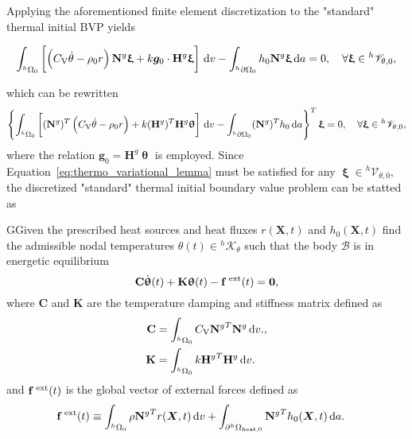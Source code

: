 Applying the aforementioned finite element discretization to the "standard" thermal initial BVP yields
\begin{highlight}
\begin{equation}
  \int_{^h\Omega_0}   \left[\left(C_\mathrm{V} \dot \theta - \rho_0 r\right)  \mathbf N^g\bm \upxi +k\bm g_0\cdot \mathbf H^g \bm \upxi\right]\,\mathrm{d} v - \int_{^h\partial\Omega_0} h_0 \mathbf N^g\bm \upxi\,\mathrm{d} a = 0,\quad \forall \bm \upxi \in {}^h\mathscr{V}_{\theta,0},
\end{equation}
\end{highlight}
which can be rewritten
\begin{equation} \label{eq:thermo_variational_lemma}
  \left\{\int_{^h\Omega_0}   \left[(\mathbf N^g)^T\left(C_\mathrm{V} \dot \theta - \rho_0 r\right) +k(\mathbf H^g)^T\mathbf H^g \bm \uptheta \right]\,\mathrm{d} v - \int_{^h\partial\Omega_0} (\mathbf N^g)^T h_0 \,\mathrm{d} a \right\}^T\bm \upxi= 0,\quad \forall \bm \upxi \in {}^h\mathscr{V}_{\theta,0},
\end{equation}
where the relation \(\bm g_0 = \mathbf H^g \bm \uptheta\) is employed.
Since Equation~\eqref{eq:thermo_variational_lemma} must be satisfied for any \(\bm \upxi\in {}^h\mathscr V_{\theta,0}\), the discretized "standard" thermal initial boundary value problem can be statted as
\begin{problem}
GGiven the prescribed heat sources and heat fluxes $r(\bm X, t)$ and $h_0(\bm X, t)$ find the admissible nodal temperatures $\theta(t)\in {^h\mathscr{K}_{\theta}}$ such that the body $\mathscr{B}$ is in energetic equilibrium
\begin{equation}
    \mathbf C \dot{ \bm\uptheta}(t) +\mathbf K\bm\uptheta(t)-\mathbf f^\text{\;ext}(t)=\mathbf 0, \label{eq:equilibrium_material}
\end{equation}
where $\mathbf C$ and \(\mathbf K\) are the temperature damping and stiffness matrix defined as
\begin{align}
  \mathbf C &= \int_{{}^h\Omega_0} C_\mathrm{V} {\mathbf{N}^g}^T \mathbf{N}^g \,\mathrm{d} v.,\\
  \mathbf K &= \int_{{}^h\Omega_0} k {\mathbf{H}^g}^T\mathbf{H}^g \,\mathrm{d} v.
\end{align}
and $\mathbf f^\text{\;ext}(t)$ is the global vector of external forces defined as
\begin{align}
    \mathbf f^\text{\;ext}(t) &\equiv \int_{^h\Omega_0} \rho{\mathbf N^g}^T r(\bm X, t)\,\mathrm{d} v + \int_{\partial^h\Omega_\text{heat,0}}{\mathbf N^g}^T h_0(\bm X, t)\,\mathrm{d} a.
\end{align}
\end{problem}
